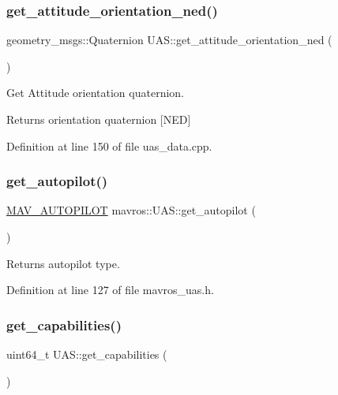 \subsubsection{\texorpdfstring{get\_attitude\_orientation\_ned()}{get\_attitude\_orientation\_ned()}}
{\footnotesize\ttfamily geometry\+\_\+msgs\+::\+Quaternion U\+A\+S\+::get\+\_\+attitude\+\_\+orientation\+\_\+ned (\begin{DoxyParamCaption}{ }\end{DoxyParamCaption})}



Get Attitude orientation quaternion. 

\begin{DoxyReturn}{Returns}
orientation quaternion \mbox{[}N\+ED\mbox{]} 
\end{DoxyReturn}


Definition at line 150 of file uas\+\_\+data.\+cpp.

\mbox{\label{group__nodelib_gad61deec4e10469fc9eb40dcc3a36aab1}} 
\subsubsection{\texorpdfstring{get\_autopilot()}{get\_autopilot()}}
{\footnotesize\ttfamily \mbox{\hyperlink{group__nodelib_gab6b5a708dff72c3923fd71d8d4730e3e}{M\+A\+V\+\_\+\+A\+U\+T\+O\+P\+I\+L\+OT}} mavros\+::\+U\+A\+S\+::get\+\_\+autopilot (\begin{DoxyParamCaption}{ }\end{DoxyParamCaption})\hspace{0.3cm}{\ttfamily [inline]}}



Returns autopilot type. 



Definition at line 127 of file mavros\+\_\+uas.\+h.

\mbox{\label{group__nodelib_ga11f231ebf1dcdf015466ecec477c5795}} 
\subsubsection{\texorpdfstring{get\_capabilities()}{get\_capabilities()}}
{\footnotesize\ttfamily uint64\+\_\+t U\+A\+S\+::get\+\_\+capabilities (\begin{DoxyParamCaption}{ }\end{DoxyParamCaption})}



